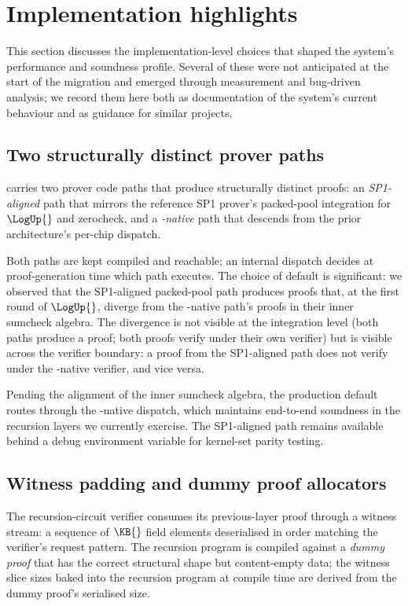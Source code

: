 \section{Implementation highlights}
\label{sec:implementation}

This section discusses the implementation-level choices that shaped the system's performance and soundness profile. Several of these were not anticipated at the start of the migration and emerged through measurement and bug-driven analysis; we record them here both as documentation of the system's current behaviour and as guidance for similar projects.

\subsection{Two structurally distinct prover paths}
\label{sec:two-paths}

\Zirenver{} carries two prover code paths that produce structurally distinct proofs: an \emph{SP1-aligned} path that mirrors the reference SP1 prover's packed-pool integration for $\LogUp{}$ and zerocheck, and a \emph{\Ziren{}-native} path that descends from the prior \Ziren{} architecture's per-chip dispatch.

Both paths are kept compiled and reachable; an internal dispatch decides at proof-generation time which path executes. The choice of default is significant: we observed that the SP1-aligned packed-pool path produces proofs that, at the first round of $\LogUp{}$, diverge from the \Ziren{}-native path's proofs in their inner sumcheck algebra. The divergence is not visible at the integration level (both paths produce a proof; both proofs verify under their own verifier) but is visible across the verifier boundary: a proof from the SP1-aligned path does not verify under the \Ziren{}-native verifier, and vice versa.

Pending the alignment of the inner sumcheck algebra, the production default routes through the \Ziren{}-native dispatch, which maintains end-to-end soundness in the recursion layers we currently exercise. The SP1-aligned path remains available behind a debug environment variable for kernel-set parity testing.

\subsection{Witness padding and dummy proof allocators}
\label{sec:witness-padding}

The recursion-circuit verifier consumes its previous-layer proof through a witness stream: a sequence of $\KB{}$ field elements deserialised in order matching the verifier's request pattern. The recursion program is compiled against a \emph{dummy proof} that has the correct structural shape but content-empty data; the witness slice sizes baked into the recursion program at compile time are derived from the dummy proof's serialised size.

